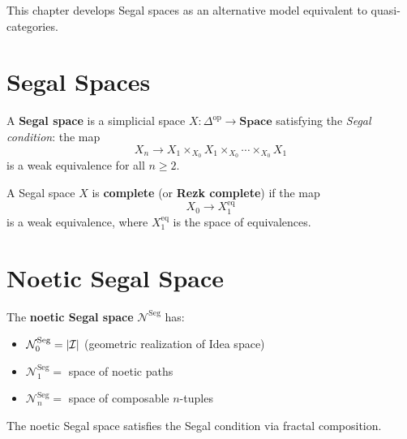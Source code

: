 \begin{tcolorbox}[colback=blue!5!white,colframe=blue!75!black,title=\vnewfour]
This chapter develops Segal spaces as an alternative model equivalent to
quasi-categories.
\end{tcolorbox}

\section{Segal Spaces}

\begin{definition}
\label{def:segal-space}
A \textbf{Segal space} is a simplicial space $X : \Delta^{\mathrm{op}} \to \mathbf{Space}$
satisfying the \emph{Segal condition}: the map
\[
X_n \to X_1 \times_{X_0} X_1 \times_{X_0} \cdots \times_{X_0} X_1
\]
is a weak equivalence for all $n \geq 2$.
\end{definition}

\begin{definition}
\label{def:complete-segal}
A Segal space $X$ is \textbf{complete} (or \textbf{Rezk complete}) if the map
\[
X_0 \to X_1^{\mathrm{eq}}
\]
is a weak equivalence, where $X_1^{\mathrm{eq}}$ is the space of equivalences.
\end{definition}

\section{Noetic Segal Space}

\begin{construction}
\label{constr:noetic-segal}
The \textbf{noetic Segal space} $\mathcal{N}^{\mathrm{Seg}}$ has:
\begin{itemize}
  \item $\mathcal{N}^{\mathrm{Seg}}_0 = |\mathcal{I}|$ (geometric realization of Idea space)
  \item $\mathcal{N}^{\mathrm{Seg}}_1 = $ space of noetic paths
  \item $\mathcal{N}^{\mathrm{Seg}}_n = $ space of composable $n$-tuples
\end{itemize}
\end{construction}

\begin{theorem}
\label{thm:noetic-segal-condition}
The noetic Segal space satisfies the Segal condition via fractal composition.
\end{theorem}

